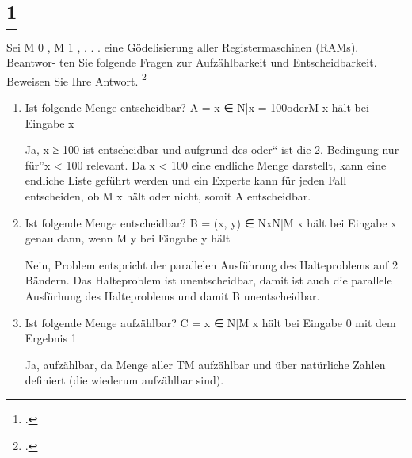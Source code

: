 \documentclass{lehramt-informatik-aufgabe}
\begin{document}
\liAufgabenTitel{}
\section{
\footcite{66115:2016:09}}

Sei M 0 , M 1 , . . . eine Gödelisierung aller Registermaschinen (RAMs).
Beantwor- ten Sie folgende Fragen zur Aufzählbarkeit und
Entscheidbarkeit. Beweisen Sie Ihre Antwort.
\footcite[Seite, Aufgabe 6]{theo:ab:4}

\begin{enumerate}


\item Ist folgende Menge entscheidbar?
A = {x ∈ N|x = 100oderM x hält bei Eingabe x}

\begin{liAntwort}
Ja, x ≥ 100 ist entscheidbar und aufgrund des oder“ ist die 2. Bedingung
nur für”x < 100 relevant. Da x < 100 eine endliche Menge darstellt, kann
eine endliche Liste geführt werden und ein Experte kann für jeden Fall
entscheiden, ob M x hält oder nicht, somit A entscheidbar.
\end{liAntwort}


\item Ist folgende Menge entscheidbar?
B = {(x, y) ∈ NxN|M x hält bei Eingabe x genau dann, wenn M y bei Eingabe
y hält}

\begin{liAntwort}
Nein, Problem entspricht der parallelen Ausführung des Halteproblems auf
2 Bändern. Das Halteproblem ist unentscheidbar, damit ist auch die
parallele Ausfürhung des Halteproblems und damit B unentscheidbar.
\end{liAntwort}


\item Ist folgende Menge aufzählbar?
C = {x ∈ N|M x hält bei Eingabe 0 mit dem Ergebnis 1}

\begin{liAntwort}
Ja, aufzählbar, da Menge aller TM aufzählbar und über natürliche Zahlen
deﬁniert (die wiederum aufzählbar sind).
\end{liAntwort}
\end{enumerate}
\end{document}
